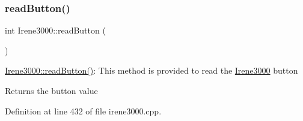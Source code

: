 \subsubsection{\texorpdfstring{read\+Button()}{readButton()}}
{\footnotesize\ttfamily int Irene3000\+::read\+Button (\begin{DoxyParamCaption}{ }\end{DoxyParamCaption})}

\hyperlink{class_irene3000_a78a87eb7cf295b95c12b2ebd51c2bb77}{Irene3000\+::read\+Button()}\+: This method is provided to read the \hyperlink{class_irene3000}{Irene3000} button

\begin{DoxyReturn}{Returns}
the button value 
\end{DoxyReturn}


Definition at line 432 of file irene3000.\+cpp.


